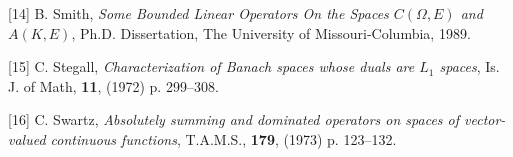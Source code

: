 \item {[14]} B. Smith, {\it Some Bounded Linear Operators On the 
Spaces
$C(\Omega,E)$ and $A(K,E)$}, Ph.D. Dissertation, The University of
Missouri-Columbia, 1989.

\item {[15]} C. Stegall, {\it Characterization of Banach spaces whose
duals are $L_1$ spaces}, Is. J. of Math, {\bf 11}, (1972) p. 299--308.

\item {[16]} C. Swartz, {\it Absolutely summing and dominated 
operators
on spaces of vector-valued continuous functions}, T.A.M.S., {\bf 179},
(1973) p. 123--132.

\vfill
\centerline{\vbox{}}

\eject

\bye
